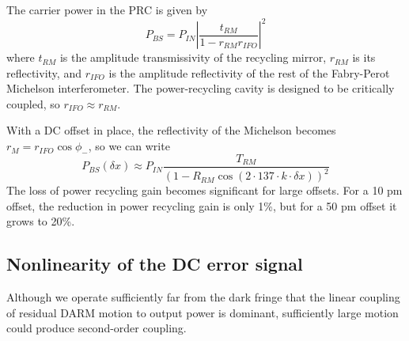 The carrier power in the PRC is given by
\begin{equation}
P_{BS} = P_{IN}\left| \frac{t_{RM}}{1 - r_{RM} r_{IFO}}\right|^2
\end{equation}
where $t_{RM}$ is the amplitude transmissivity of the recycling
mirror, $r_{RM}$ is its reflectivity, and $r_{IFO}$ is the amplitude
reflectivity of the rest of the Fabry-Perot Michelson interferometer.
The power-recycling cavity is designed to be critically coupled, so
$r_{IFO}\approx r_{RM}$.

With a DC offset in place, the reflectivity of the Michelson becomes $r_M = r_{IFO}\cos\phi_-$, so we can write
\begin{equation}
P_{BS}(\delta x) \approx P_{IN} 
\frac{T_{RM}}{\left(1 - R_{RM} \cos\left(2\cdot137\cdot k\cdot\delta x\right)\right)^2}
\end{equation}
The loss of power recycling gain becomes significant for large
offsets.  For a 10 pm offset, the reduction in power recycling gain is
only 1\%, but for a 50 pm offset it grows to 20\%.

\subsection{Nonlinearity of the DC error signal}

Although we operate sufficiently far from the dark fringe that the
linear coupling of residual DARM motion to output power is dominant,
sufficiently large motion could produce second-order coupling. 

